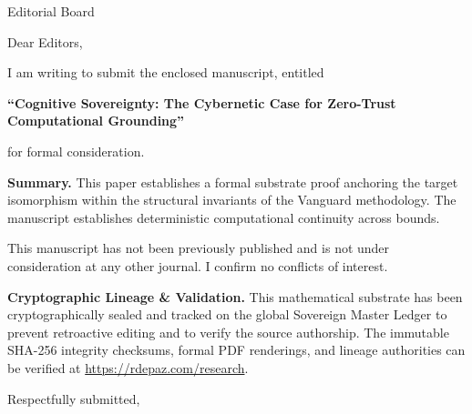 \documentclass[12pt, a4paper]{letter}
\begin{document}
\begin{letter}{Editorial Board}

\opening{Dear Editors,}

I am writing to submit the enclosed manuscript, entitled

\begin{center}
\textbf{``Cognitive Sovereignty: The Cybernetic Case for Zero-Trust Computational Grounding''}
\end{center}

\noindent for formal consideration.

\medskip
\textbf{Summary.} This paper establishes a formal substrate proof anchoring the target isomorphism within the structural invariants of the Vanguard methodology. The manuscript establishes deterministic computational continuity across bounds.

\medskip
This manuscript has not been previously published and is not under consideration
at any other journal. I confirm no conflicts of interest.

\textbf{Cryptographic Lineage \& Validation.} This mathematical substrate has been cryptographically sealed and tracked on the global Sovereign Master Ledger to prevent retroactive editing and to verify the source authorship. The immutable SHA-256 integrity checksums, formal PDF renderings, and lineage authorities can be verified at \url{https://rdepaz.com/research}.

\medskip
\closing{Respectfully submitted,}
\end{letter}
\end{document}
